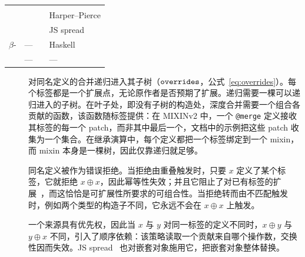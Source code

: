 \begin{CJK*}{UTF8}{gbsn}
{\small
\begin{center}
  \begin{tabular}{llL{0.17\textwidth}L{0.3\textwidth}}
    & 
    & 
    &  \\
    \hline
    & 
    &  &  \\
    & 
    & 
    & Harper--Pierce \\
    & 
    & 
    & JS spread \\
    \hline
    $\beta$-
    & ---
    &  & Haskell \\
    & ---
    &  & --- \\
  \end{tabular}
\end{center}
}

\begin{description}
  \item[]
    对同名定义的合并递归进入其子树（$\mathtt{overrides}$，公式~\ref{eq:overrides}）。每个标签都是一个扩展点，无论原作者是否预期了扩展。递归需要一棵可以递归进入的子树。在叶子处，即没有子树的构造处，深度合并需要一个组合各贡献的函数，该函数随标签提供：在 MIXINv2 中，一个 \texttt{@merge} 定义接收其标签的每一个 patch，而非其中最后一个，文档中的示例把这些 patch 收集为一个集合。在继承演算中，每个定义都把一个标签绑定到一个 mixin，而 mixin 本身是一棵树，因此仅靠递归就足够。

  \item[]
    同名定义被作为错误拒绝。当拒绝由重叠触发时，只要 $x$ 定义了某个标签，它就拒绝 $x \oplus x$，因此幂等性失效；并且它阻止了对已有标签的扩展~\cite{harper1991-symmetric-record-concatenation}，而这恰恰是可扩展性所要求的可组合性。当拒绝转而由不匹配触发时，例如两个类型的构造子不同，它永远不会在 $x \oplus x$ 上触发。

  \item[]
    一个来源具有优先权，因此当 $x$ 与 $y$ 对同一标签的定义不同时，$x \oplus y$ 与 $y \oplus x$ 不同，引入了顺序依赖：该策略读取一个贡献来自哪个操作数，交换性因而失效。JS spread~\cite{ecma2018-ecmascript} 也对嵌套对象施用它，把嵌套对象整体替换。


\end{description}
\end{CJK*}
